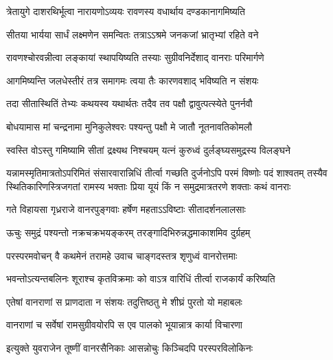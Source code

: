 \twolineshloka
{त्रेतायुगे दाशरथिर्भूत्वा नारायणोऽव्ययः}
{रावणस्य वधार्थाय दण्डकानागमिष्यति} %

\twolineshloka
{सीतया भार्यया सार्धं लक्ष्मणेन समन्वितः}
{तत्राऽऽश्रमे जनकजां भ्रातृभ्यां रहिते वने} %

\twolineshloka
{रावणश्चोरवन्नीत्वा लङ्कायां स्थापयिष्यति}
{तस्याः सुग्रीवनिर्देशाद् वानराः परिमार्गणे} %

\twolineshloka
{आगमिष्यन्ति जलधेस्तीरं तत्र समागमः}
{त्वया तैः कारणवशाद् भविष्यति न संशयः} %

\twolineshloka
{तदा सीतास्थितिं तेभ्यः कथयस्व यथार्थतः}
{तदैव तव पक्षौ द्वावुत्पत्स्येते पुनर्नवौ} %


\twolineshloka
{बोधयामास मां चन्द्रनामा मुनिकुलेश्वरः}
{पश्यन्तु पक्षौ मे जातौ नूतनावतिकोमलौ} %

\twolineshloka
{स्वस्ति वोऽस्तु गमिष्यामि सीतां द्रक्ष्यथ निश्चयम्}
{यत्नं कुरुध्वं दुर्लङ्घ्यसमुद्रस्य विलङ्घने} %

\fourlineindentedshloka
{यन्नामस्मृतिमात्रतोऽपरिमितं संसारवारान्निधिं}
{तीर्त्वा गच्छति दुर्जनोऽपि परमं विष्णोः पदं शाश्वतम्}
{तस्यैव स्थितिकारिणस्त्रिजगतां रामस्य भक्ताः प्रिया}
{यूयं किं न समुद्रमात्रतरणे शक्ताः कथं वानराः} %






\twolineshloka
{गते विहायसा गृध्रराजे वानरपुङ्गवाः}
{हर्षेण महताऽऽविष्टाः सीतादर्शनलालसाः} %

\twolineshloka
{ऊचुः समुद्रं पश्यन्तो नक्रचक्रभयङ्करम्}
{तरङ्गादिभिरुन्नद्धमाकाशमिव दुर्ग्रहम्} %

\twolineshloka
{परस्परमवोचन् वै कथमेनं तरामहे}
{उवाच चाङ्गदस्तत्र शृणुध्वं वानरोत्तमाः} %

\twolineshloka
{भवन्तोऽत्यन्तबलिनः शूराश्च कृतविक्रमाः}
{को वाऽत्र वारिधिं तीर्त्वा राजकार्यं करिष्यति} %

\twolineshloka
{एतेषां वानराणां स प्राणदाता न संशयः}
{तदुत्तिष्ठतु मे शीघ्रं पुरतो यो महाबलः} %

\twolineshloka
{वानराणां च सर्वेषां रामसुग्रीवयोरपि}
{स एव पालको भूयान्नात्र कार्या विचारणा} %

\twolineshloka
{इत्युक्ते युवराजेन तूष्णीं वानरसैनिकाः}
{आसन्नोचुः किञ्चिदपि परस्परविलोकिनः} %

